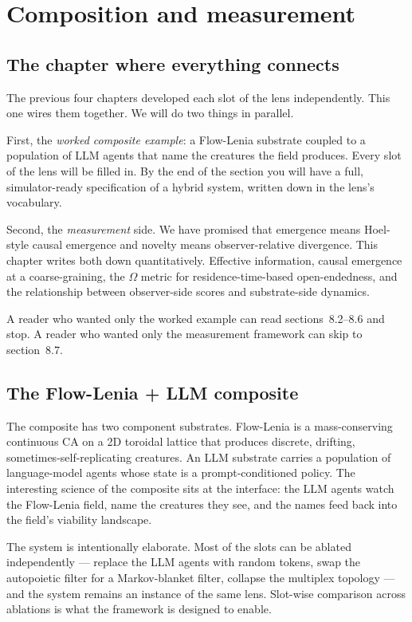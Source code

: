 \chapter{Composition and measurement}

\section{The chapter where everything connects}

The previous four chapters developed each slot of the lens
independently. This one wires them together. We will do two things in
parallel.

First, the \emph{worked composite example}: a Flow-Lenia substrate
coupled to a population of LLM agents that name the creatures the
field produces. Every slot of the lens will be filled in. By the end of
the section you will have a full, simulator-ready specification of a
hybrid system, written down in the lens's vocabulary.

Second, the \emph{measurement} side. We have promised that emergence
means Hoel-style causal emergence and novelty means observer-relative
divergence. This chapter writes both down quantitatively. Effective
information, causal emergence at a coarse-graining, the $\Omega$
metric for residence-time-based open-endedness, and the relationship
between observer-side scores and substrate-side dynamics.

A reader who wanted only the worked example can read sections~8.2--8.6
and stop. A reader who wanted only the measurement framework can skip
to section~8.7.

\section{The Flow-Lenia + LLM composite}

The composite has two component substrates. Flow-Lenia is a
mass-conserving continuous CA on a 2D toroidal lattice that produces
discrete, drifting, sometimes-self-replicating creatures. An LLM
substrate carries a population of language-model agents whose state is
a prompt-conditioned policy. The interesting science of the composite
sits at the interface: the LLM agents watch the Flow-Lenia field, name
the creatures they see, and the names feed back into the field's
viability landscape.

The system is intentionally elaborate. Most of the slots can be
ablated independently --- replace the LLM agents with random tokens,
swap the autopoietic filter for a Markov-blanket filter, collapse the
multiplex topology --- and the system remains an instance of the same
lens. Slot-wise comparison across ablations is what the framework is
designed to enable.

